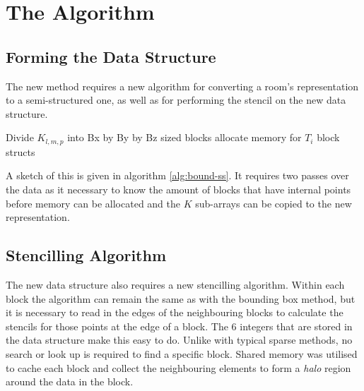 \documentclass[12pt,a4paper]{report}
\begin{document}
\section{The Algorithm}

\subsection{Forming the Data Structure}

The new method requires a new algorithm for converting a room's representation to a semi-structured one, as well as for performing the stencil on the new data structure.


\begin{algorithm}[H]
\label{alg:bound-ss}
 Divide $K_{l,m,p}$ into Bx by By by Bz sized blocks\;
 allocate memory for $T_{i}$ block structs\;
 \caption{Convert bounding box to array of blocks}
\end{algorithm}

A sketch of this is given in algorithm \ref{alg:bound-ss}. It requires two passes over the data as it necessary to know the amount of blocks that have internal points before memory can be allocated and the $K$ sub-arrays can be copied to the new representation.

\subsection{Stencilling Algorithm}

The new data structure also requires a new stencilling algorithm. Within each block the algorithm can remain the same as with the bounding box method, but it is necessary to read in the edges of the neighbouring blocks to calculate the stencils for those points at the edge of a block. The 6 integers that are stored in the data structure make this easy to do. Unlike with typical sparse methods, no search or look up is required to find a specific block. Shared memory was utilised to cache each block and collect the neighbouring elements to form a \textit{halo} region around the data in the block.
\end{document}
